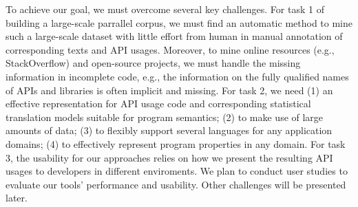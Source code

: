 \begin{itemize}
To achieve our goal, we must overcome several key challenges. For task
1 of building a large-scale parrallel corpus, we must find an
automatic method to mine such a large-scale dataset with little effort
from human in manual annotation of corresponding texts and API usages.
Moreover, to mine online resources (e.g., StackOverflow) and
open-source projects, we must handle the missing information in
incomplete code, e.g., the information on the fully qualified names of
APIs and libraries is often implicit and missing. For task 2, we need
(1) an effective representation for API usage code and corresponding
statistical translation models suitable for program semantics; (2) to
make use of large amounts of data; (3) to flexibly support
several languages for any application domains; (4) to effectively
represent program properties in any domain. For task 3, the usability
for our approaches relies on how we present the resulting API usages
to developers in different enviroments. We plan to conduct user
studies to evaluate our tools' performance and usability. Other
challenges will be presented later.


%
%

\end{itemize}

